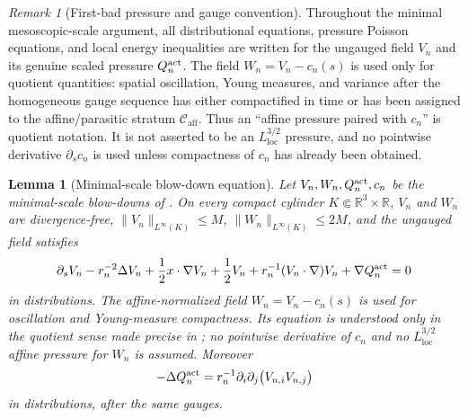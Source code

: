 \documentclass[11pt]{amsart}
\numberwithin{equation}{section}
\theoremstyle{plain}
\newtheorem{lemma}[lemma]{Lemma}
\theoremstyle{definition}
\theoremstyle{remark}
\newtheorem{remark}[remark]{Remark}
\newcommand{\loc}{\mathrm{loc}}
\newcommand{\Caff}{\mathcal C_{\mathrm{aff}}}
\begin{document}
\begin{remark}[First-bad pressure and gauge convention]
\label{rem:first-bad-pressure-gauge-rule}
Throughout the minimal mesoscopic-scale argument, all distributional equations,
pressure Poisson equations, and local energy inequalities are written for the
ungauged field \(V_n\) and its genuine scaled pressure \(Q_n^{\rm act}\).  The field
\(W_n=V_n-c_n(s)\) is used only for quotient quantities: spatial oscillation,
Young measures, and variance after the homogeneous gauge sequence has either
compactified in time or has been assigned to the affine/parasitic stratum
\(\Caff\).  Thus an ``affine pressure paired with \(c_n\)'' is quotient
notation.  It is not asserted to be an \(L^{3/2}_{\loc}\) pressure, and no
pointwise derivative \(\partial_s c_n\) is used unless compactness of \(c_n\)
has already been obtained.
\end{remark}

\begin{lemma}[Minimal-scale blow-down equation]
\label{lem:first-bad-blowdown-equation}
Let \(V_n,W_n,Q_n^{\rm act},c_n\) be the minimal-scale blow-downs of
.  On every compact cylinder
\(K\Subset\mathbb R^3\times\mathbb R\), \(V_n\) and \(W_n\) are
divergence-free, \(\|V_n\|_{L^\infty(K)}\le M\),
\(\|W_n\|_{L^\infty(K)}\le2M\), and the ungauged field satisfies
\begin{equation}\label{eq:first-bad-scaled-equation}
   \partial_sV_n
   -r_n^{-2}\Delta V_n
   +\frac12x\cdot\nabla V_n+\frac12V_n
   +r_n^{-1}(V_n\cdot\nabla)V_n
   +\nabla Q_n^{\rm act}
   =0
\end{equation}
in distributions.  The affine-normalized field \(W_n=V_n-c_n(s)\) is used for
oscillation and Young-measure compactness.  Its equation is understood only in
the quotient sense made precise in
; no pointwise derivative of \(c_n\)
and no \(L^{3/2}_{\loc}\) affine pressure for \(W_n\) is assumed.
Moreover
\begin{equation}\label{eq:first-bad-pressure-poisson}
   -\Delta Q_n^{\rm act}
   =
   r_n^{-1}\partial_i\partial_j
   \bigl(V_{n,i}V_{n,j}\bigr)
\end{equation}
in distributions, after the same gauges.
\end{lemma}
\end{document}
